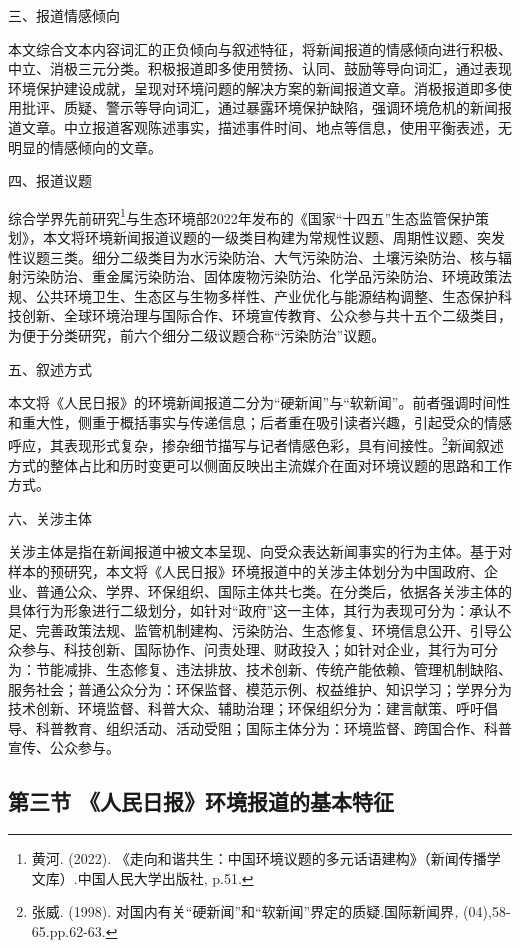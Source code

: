 三、报道情感倾向

本文综合文本内容词汇的正负倾向与叙述特征，将新闻报道的情感倾向进行积极、中立、消极三元分类。积极报道即多使用赞扬、认同、鼓励等导向词汇，通过表现环境保护建设成就，呈现对环境问题的解决方案的新闻报道文章。消极报道即多使用批评、质疑、警示等导向词汇，通过暴露环境保护缺陷，强调环境危机的新闻报道文章。中立报道客观陈述事实，描述事件时间、地点等信息，使用平衡表述，无明显的情感倾向的文章。

四、报道议题

综合学界先前研究\footnote{黄河. (2022).
  《走向和谐共生：中国环境议题的多元话语建构》（新闻传播学文库）.中国人民大学出版社,
  p.51.}与生态环境部2022年发布的《国家``十四五''生态监管保护策划》，本文将环境新闻报道议题的一级类目构建为常规性议题、周期性议题、突发性议题三类。细分二级类目为水污染防治、大气污染防治、土壤污染防治、核与辐射污染防治、重金属污染防治、固体废物污染防治、化学品污染防治、环境政策法规、公共环境卫生、生态区与生物多样性、产业优化与能源结构调整、生态保护科技创新、全球环境治理与国际合作、环境宣传教育、公众参与共十五个二级类目，为便于分类研究，前六个细分二级议题合称``污染防治''议题。

五、叙述方式

本文将《人民日报》的环境新闻报道二分为``硬新闻''与``软新闻''。前者强调时间性和重大性，侧重于概括事实与传递信息；后者重在吸引读者兴趣，引起受众的情感呼应，其表现形式复杂，掺杂细节描写与记者情感色彩，具有间接性。\footnote{张威.
  (1998). 对国内有关``硬新闻''和``软新闻''界定的质疑.国际新闻界\emph{,}
  (04),58-65.pp.62-63.}新闻叙述方式的整体占比和历时变更可以侧面反映出主流媒介在面对环境议题的思路和工作方式。

六、关涉主体

关涉主体是指在新闻报道中被文本呈现、向受众表达新闻事实的行为主体。基于对样本的预研究，本文将《人民日报》环境报道中的关涉主体划分为中国政府、企业、普通公众、学界、环保组织、国际主体共七类。在分类后，依据各关涉主体的具体行为形象进行二级划分，如针对``政府''这一主体，其行为表现可分为：承认不足、完善政策法规、监管机制建构、污染防治、生态修复、环境信息公开、引导公众参与、科技创新、国际协作、问责处理、财政投入；如针对企业，其行为可分为：节能减排、生态修复、违法排放、技术创新、传统产能依赖、管理机制缺陷、服务社会；普通公众分为：环保监督、模范示例、权益维护、知识学习；学界分为技术创新、环境监督、科普大众、辅助治理；环保组织分为：建言献策、呼吁倡导、科普教育、组织活动、活动受阻；国际主体分为：环境监督、跨国合作、科普宣传、公众参与。

\subsection{第三节
《人民日报》环境报道的基本特征}\label{ux7b2cux4e09ux8282-ux4ebaux6c11ux65e5ux62a5ux73afux5883ux62a5ux9053ux7684ux57faux672cux7279ux5f81}

